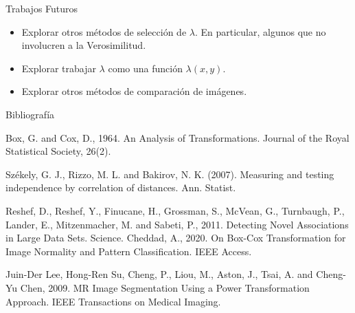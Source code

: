 \documentclass{beamer}
\begin{document}
\begin{frame}{Trabajos Futuros}
    \begin{itemize}
        \pause
        \item Explorar otros métodos de selección de $\lambda$.
        \pause 
        En particular, algunos que no involucren a la Verosimilitud.
        \pause 
        \item Explorar trabajar $\lambda$ como una función $\lambda(x, y)$.
        \pause
        \item Explorar otros métodos de comparación de imágenes.
    \end{itemize}
    
\end{frame}


\begin{frame}{Bibliografía}
    \begin{thebibliography}{9}
    Box, G. and Cox, D., 1964. An Analysis of Transformations. Journal of the Royal Statistical Society, 26(2).
    
    Székely, G. J., Rizzo, M. L. and Bakirov, N. K. (2007). Measuring and testing independence by correlation of distances. Ann. Statist.

    Reshef, D., Reshef, Y., Finucane, H., Grossman, S., McVean, G., Turnbaugh, P., Lander, E., Mitzenmacher, M. and Sabeti, P., 2011. Detecting Novel Associations in Large Data Sets. Science.
    Cheddad, A., 2020. On Box-Cox Transformation for Image Normality and Pattern Classification. IEEE Access.
    
    Juin-Der Lee, Hong-Ren Su, Cheng, P., Liou, M., Aston, J., Tsai, A. and Cheng-Yu Chen, 2009. MR Image Segmentation Using a Power Transformation Approach. IEEE Transactions on Medical Imaging.
    \end{thebibliography}
\end{frame}
\end{document}
